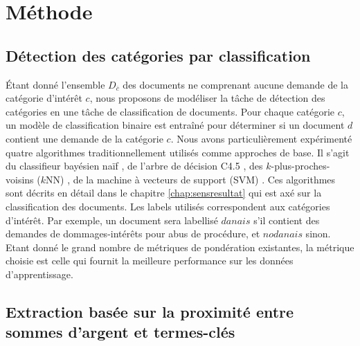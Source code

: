 \section{Méthode}

\subsection{Détection des catégories par classification}
\label{sec:quanta:classification}
Étant donné l'ensemble $D_{\overline{c}}$ des documents ne comprenant aucune demande de la catégorie d'intérêt $c$, nous proposons de modéliser la tâche de détection des catégories en une tâche de classification de documents. Pour chaque catégorie $c$, un modèle de classification binaire est entraîné pour déterminer si un document $d$ contient une demande de la catégorie $c$. Nous avons particulièrement expérimenté quatre algorithmes traditionnellement utilisés comme approches de base. Il s'agit du classifieur bayésien naïf \citep{duda1973patternclass}, de l'arbre de décision C4.5 \citep{quinlan1993c4.5}, des $k$-plus-proches-voisins ($k$NN) \citep{cover1967knn}, de la machine à vecteurs de support (SVM) \citep{vapnik1995statlearning}. Ces algorithmes sont décrits en détail dans le chapitre \ref{chap:sensresultat} qui est axé sur la classification des documents. Les labels utilisés correspondent aux catégories d'intérêt. Par exemple, un document sera labellisé $danais$ s'il contient des demandes de dommages-intérêts pour abus de procédure, et $nodanais$ sinon. Etant donné le grand nombre de métriques de pondération existantes, la métrique choisie est celle qui fournit la meilleure performance sur les données d'apprentissage.

\subsection{Extraction basée sur la proximité entre sommes d'argent et termes-clés}
\label{sec:quanta:extraction}

